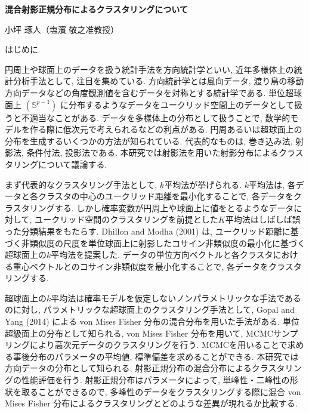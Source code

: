 \documentclass[a4j,11pt]{jarticle}
\makeatletter
\def\section{\@startsection{section}{1}{\z@}
   {0.8\Cvs \@plus.5\Cdp \@minus.2\Cdp}
   {0.2\Cvs \@plus.3\Cdp}
   {\normalfont \Large \bfseries}}
\makeatother
\begin{document}

\begin{center}
{\Large \textbf{混合射影正規分布によるクラスタリングについて}}
\end{center}
\begin{flushright}
小坪 琢人（塩濱 敬之准教授）
\end{flushright}
\vspace{-3zh}


\section{はじめに}

円周上や球面上のデータを扱う統計手法を方向統計学といい, 近年多様体上の統計分析手法として, 注目を集めている. 方向統計学とは風向データ, 渡り鳥の移動方向データなどの角度観測値を含むデータを対称とする統計学である. 単位超球面上 $(\mathbb{S}^{p-1})$ に分布するようなデータをユークリッド空間上のデータとして扱うと不適当なことがある. データを多様体上の分布として扱うことで, 数学的モデルを作る際に低次元で考えられるなどの利点がある. 円周あるいは超球面上の分布を生成するいくつかの方法が知られている. 代表的なものは, 巻き込み法, 射影法, 条件付法, 投影法である. 本研究では射影法を用いた射影分布によるクラスタリングについて議論する.

まず代表的なクラスタリング手法として, $k$平均法が挙げられる. $k$平均法は, 各データと各クラスタの中心のユークリッド距離を最小化することで, 各データをクラスタリングする. しかし確率変数が円周上や球面上に値をとるようなデータに対して, ユークリッド空間のクラスタリングを前提とした$K$平均法はしばしば誤った分類結果をもたらす. Dhillon and Modha (2001) は, ユークリッド距離に基づく非類似度の尺度を単位球面上に射影したコサイン非類似度の最小化に基づく超球面上の$k$平均法を提案した. データの単位方向ベクトルと各クラスタにおける重心ベクトルとのコサイン非類似度を最小化することで, 各データをクラスタリングする. 

超球面上の$k$平均法は確率モデルを仮定しないノンパラメトリックな手法であるのに対し,  パラメトリックな超球面上のクラスタリング手法として, Gopal and Yang (2014) による von Mises Fisher 分布の混合分布を用いた手法がある. 単位超級面上の分布として知られる, von Mises Fisher 分布を用いて, MCMCサンプリングにより高次元データのクラスタリングを行う. MCMCを用いることで求める事後分布のパラメータの平均値, 標準偏差を求めることができる. 本研究では方向データの分布として知られる, 射影正規分布の混合分布によるクラスタリングの性能評価を行う. %
射影正規分布はパラメータによって, 単峰性・二峰性の形状を取ることができるので, 多峰性のデータをクラスタリングする際に混合 von Mises Fisher 分布によるクラスタリングとどのような差異が現れるか比較する.
\end{document}
